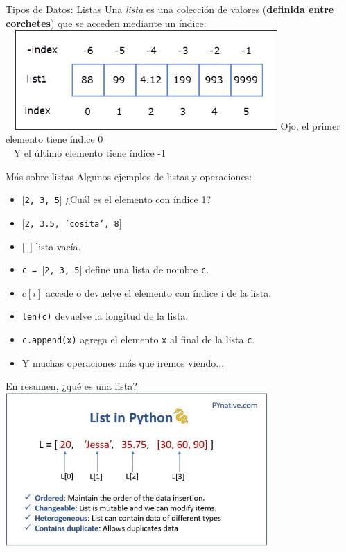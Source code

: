 \documentclass{beamer}
\begin{document}
\begin{frame}{Tipos de Datos:  Listas}
Una \emph{lista} es una colección de valores (\textbf{definida entre corchetes}) que se acceden mediante un índice:  \pause
\\~\
\includegraphics[width=10cm]{lista.png} \pause
\alert{Ojo, el primer elemento tiene índice 0}\pause
\\~
\alert{Y el último elemento tiene índice -1}
\end{frame}


\begin{frame}{Más sobre listas}
Algunos ejemplos de listas y operaciones:
\begin{itemize}
	\item \texttt{$[$2, 3, 5$]$} \pause 
		¿Cuál es el elemento con índice 1?\pause
	\item \texttt{$[$2, 3.5, 'cosita', 8$]$}\pause
	\item \texttt{$[$ $]$} lista vacía.\pause
	\item \texttt{c = $[$2, 3, 5$]$} define una lista de nombre \texttt{c}.
	\item \texttt{$c[i]$} accede o devuelve el elemento con índice i de la lista.\pause
	\item \texttt{len(c)} devuelve la longitud de la lista.\pause
	\item \texttt{c.append(x)} agrega el elemento \texttt{x} al final de la lista \texttt{c}.
	\item Y muchas operaciones más que iremos viendo...
\end{itemize}
\end{frame}

\begin{frame}{En resumen, ¿qué es una lista?}
\pause
\includegraphics[width=10cm]{python_list.png} 
\end{frame}
\end{document}
